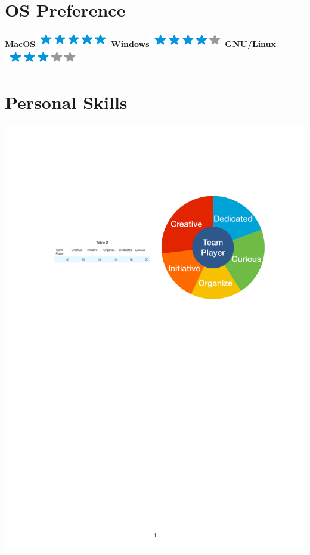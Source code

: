 \documentclass[]{friggeri-cv}
\begin{document}
\begin{aside}
  \section{OS Preference}
    \textbf{MacOS}\includegraphics[scale=0.40]{img/5stars.png}
    \textbf{Windows}\includegraphics[scale=0.40]{img/4stars.png}
    \textbf{GNU/Linux}\includegraphics[scale=0.40]{img/3stars.png}
    ~
  \section{Personal Skills}
    \includegraphics[width=\linewidth]{img/personality.pdf}
    ~
\end{aside}
\end{document}
